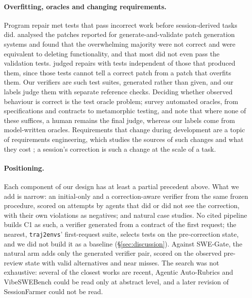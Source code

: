 \paragraph{Overfitting, oracles and changing requirements.} Program repair met tests that pass incorrect work before session-derived tasks did. \textcite{qi2015plausibility} analysed the patches reported for generate-and-validate patch generation systems and found that the overwhelming majority were not correct and were equivalent to deleting functionality, and that most did not even pass the validation tests. \textcite{smith2015cure} judged repairs with tests independent of those that produced them, since those tests cannot tell a correct patch from a patch that overfits them. Our verifiers are such test suites, generated rather than given, and our labels judge them with separate reference checks. Deciding whether observed behaviour is correct is the test oracle problem; \textcite{barr2015oracle} survey automated oracles, from specifications and contracts to metamorphic testing, and note that where none of these suffices, a human remains the final judge, whereas our labels come from model-written oracles. Requirements that change during development are a topic of requirements engineering, which studies the sources of such changes and what they cost \cite{mcgee2012causes}; a session's correction is such a change at the scale of a task.

\paragraph{Positioning.} Each component of our design has at least a partial precedent above. What we add is narrow: an initial-only and a correction-aware verifier from the same frozen procedure, scored on attempts by agents that did or did not see the correction, with their own violations as negatives; and natural case studies. No cited pipeline builds C1 as such, a verifier generated from a contract of the first request; the nearest, \texttt{traj2envs}' first-request suite, selects tests on the pre-correction state, and we did not build it as a baseline (\S\ref{sec:discussion}). Against SWE-Gate, the natural arm adds only the generated verifier pair, scored on the observed pre-review state with valid alternatives and near misses. The search was not exhaustive: several of the closest works are recent, Agentic Auto-Rubrics and VibeSWEBench could be read only at abstract level, and a later revision of SessionFarmer could not be read.
